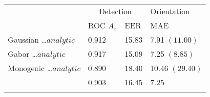 \begin{tabularx}{\linewidth}{X X X X}

\toprule
       & \multicolumn{2}{c}{Detection}  & Orientation \\
       & ROC $A_z$    & EER   & MAE \\
\midrule
Gaussian \newline \ldots $analytic$
        & 0.912    & 15.83  & 7.91 \newline $(11.00)$  \\

Gabor \newline \ldots $analytic$
        & 0.917    & 15.09  & 7.25 \newline $(8.85)$  \\

Monogenic \newline \ldots $analytic$
        & 0.890    & 18.40  & 10.46 \newline $(29.40)$  \\

\dtcwt{}  & 0.903    & 16.45  & 7.25  \\

\bottomrule
\noalign{\smallskip}
\end{tabularx}